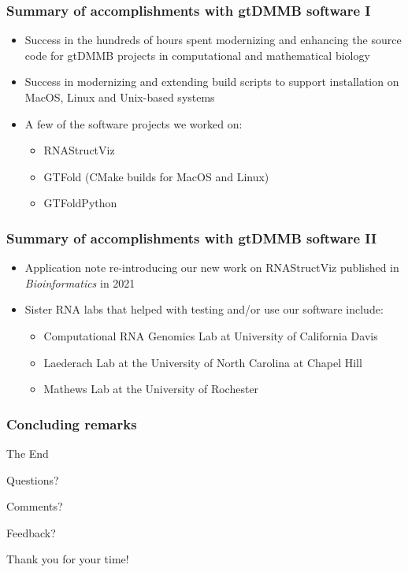 \documentclass[usenames,svgnames,dvipsnames,11pt]{beamer}
\begin{document}
\begin{frame}
\frametitle{Summary of accomplishments with gtDMMB software I}
\begin{itemize} 

\item Success in the hundreds of hours spent modernizing and enhancing the source code for 
      gtDMMB projects in computational and mathematical biology 
\item Success in modernizing and extending build scripts to support installation on MacOS, 
      Linux and Unix-based systems 
\item A few of the software projects we worked on:
	\begin{itemize}
	\item RNAStructViz 
	\item GTFold (CMake builds for MacOS and Linux)
	\item GTFoldPython
	\end{itemize}

\end{itemize}

\end{frame}

\begin{frame}
\frametitle{Summary of accomplishments with gtDMMB software II}
\begin{itemize} 

\item Application note re-introducing our new work on RNAStructViz 
      published in \emph{Bioinformatics} in 2021
\item Sister RNA labs that helped with testing and/or use our software include: 
	\begin{itemize}
	\item Computational RNA Genomics Lab at University of California Davis
	\item Laederach Lab at the University of North Carolina at Chapel Hill
	\item Mathews Lab at the University of Rochester
	\end{itemize}

\end{itemize}

\end{frame}

\begin{frame}
\frametitle{Concluding remarks} 

     \Huge{\centerline{The End}}\smallskip
     \Large{\centerline{Questions?}}\smallskip
     \Large{\centerline{Comments?}}\smallskip
     \Large{\centerline{Feedback?}}\bigskip
     \Huge{\centerline{Thank you for your time!}} 

\end{frame}
\end{document}

